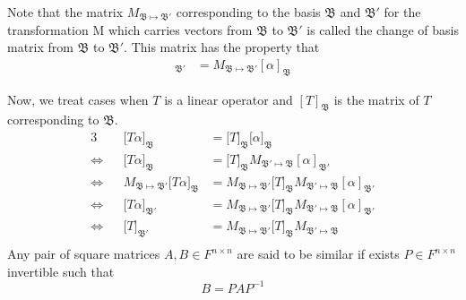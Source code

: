 \documentclass[../main.tex]{subfiles}
\begin{document}
Note that the matrix $M_{\mathfrak{B}\mapsto\mathfrak{B'}}$ corresponding to the basis $\mathfrak{B}$ and $\mathfrak{B'}$ for the transformation M which carries vectors from $\mathfrak{B}$ to $\mathfrak{B'}$ is called the change of basis matrix from $\mathfrak{B}$ to $\mathfrak{B'}$. This matrix has the property that 
\begin{align*}
    [\alpha]_{\mathfrak{B'}}&=
    M_{\mathfrak{B}\mapsto\mathfrak{B'}}[\alpha]_{\mathfrak{B}}
\end{align*}

Now, we treat cases when $T$ is a linear operator and $[T]_{\mathfrak{B}}$ is the matrix of $T$ corresponding to $\mathfrak{B}$.
\begin{alignat*}{3}
    &
    &\big[T\alpha\big]_{\mathfrak{B}} 
    &=\big[T\big]_{\mathfrak{B}}\big[\alpha\big]_{\mathfrak{B}}
    \\
    \Longleftrightarrow&
    &\big[T\alpha\big]_{\mathfrak{B}} 
    &=\big[T\big]_{\mathfrak{B}}M_{\mathfrak{B'}\mapsto\mathfrak{B}}[\alpha]_{\mathfrak{B'}}
    \\
    \Longleftrightarrow&
    &M_{\mathfrak{B}\mapsto\mathfrak{B'}}\big[T\alpha\big]_{\mathfrak{B}} 
    &=M_{\mathfrak{B}\mapsto\mathfrak{B'}}\big[T\big]_{\mathfrak{B}}M_{\mathfrak{B'}\mapsto\mathfrak{B}}[\alpha]_{\mathfrak{B'}}
    \\
    \Longleftrightarrow&
    &\big[T\alpha\big]_{\mathfrak{B'}} 
    &=M_{\mathfrak{B}\mapsto\mathfrak{B'}}\big[T\big]_{\mathfrak{B}}M_{\mathfrak{B'}\mapsto\mathfrak{B}}[\alpha]_{\mathfrak{B'}}
    \\
    \Longleftrightarrow&
    &\big[T\big]_{\mathfrak{B'}} 
    &=M_{\mathfrak{B}\mapsto\mathfrak{B'}}\big[T\big]_{\mathfrak{B}}M_{\mathfrak{B'}\mapsto\mathfrak{B}}
    \\
\end{alignat*}
Any pair of square matrices $A,B\in F^{n\times n}$ are said to be similar if exists $P\in F^{n\times n}$ invertible such that
\begin{equation*}
    B = PAP^{-1}
\end{equation*}
\end{document}
